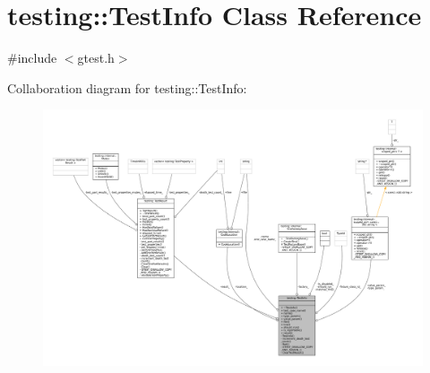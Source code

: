 \hypertarget{classtesting_1_1TestInfo}{}\section{testing\+:\+:Test\+Info Class Reference}
\label{classtesting_1_1TestInfo}


{\ttfamily \#include $<$gtest.\+h$>$}



Collaboration diagram for testing\+:\+:Test\+Info\+:
\nopagebreak
\begin{figure}[H]
\begin{center}
\leavevmode
\includegraphics[width=350pt]{classtesting_1_1TestInfo__coll__graph}
\end{center}
\end{figure}
